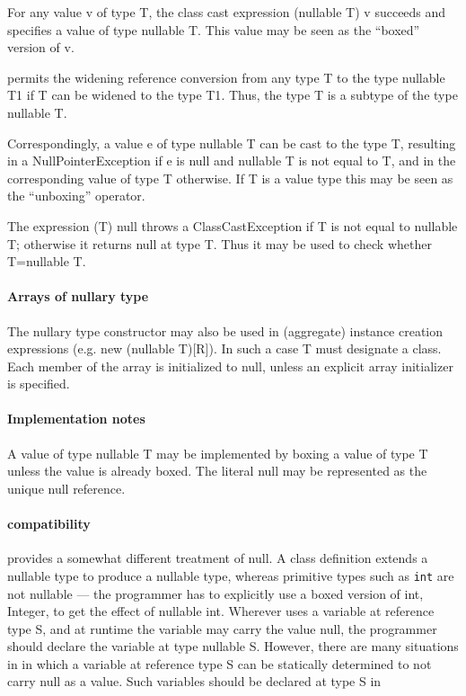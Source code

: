 For any value {\cf v} of type {\cf T}, the class cast expression {\cf
(nullable T) v} succeeds and specifies a value of type {\cf nullable
T}. This value may be seen as the ``boxed'' version of {\cf v}.

\Xten{} permits the widening reference conversion from any type {\cf T}
to the type {\cf nullable T1} if {\cf T} can be widened to the type {\cf
T1}. Thus, the type {\cf T} is a subtype of the type {\cf nullable T}.

Correspondingly, a value {\cf e} of type {\cf nullable T} can be cast to the
type {\cf T}, resulting in a {\cf NullPointerException} if {\cf e} is
{\cf null} and {\cf nullable T} is not equal to {\cf T}, and in the
corresponding value of type {\cf T} otherwise.  If {\cf T} is a value
type this may be seen as the ``unboxing'' operator.

The expression {\cf (T) null} throws a {\cf ClassCastException} if {\cf
T} is not equal to {\cf nullable T}; otherwise it returns {\cf null} at type
{\cf T}. Thus it may be used to check whether {\cf T=nullable T}.

\paragraph{Arrays of nullary type}
The nullary type constructor may also be used in (aggregate) instance
creation expressions (e.g.{} {\cf new (nullable T)[R]}). In such a
case {\cf T} must designate a class. Each member of the array is
initialized to {\cf null}, unless an explicit array initializer is
specified.

\paragraph{Implementation notes}
A value of type {\cf nullable T} may be implemented by boxing a value of
type {\cf T} unless the value is already boxed. The literal {\cf null}
may be represented as the unique null reference.

\paragraph{\Java{} compatibility}

\java{} provides a somewhat different treatment of {\cf null}.  A
class definition extends a nullable type to produce a nullable type,
whereas primitive types such as {\tt int} are not nullable --- the
programmer has to explicitly use a boxed version of {\cf int}, {\cf
Integer}, to get the effect of {\cf nullable int}. Wherever \Java{} uses a
variable at reference type {\cf S}, and at runtime the variable may
carry the value {\cf null}, the \Xten{} programmer should declare the
variable at type {\cf nullable S}. However, there are many situations
in \java{} in which a variable at reference type {\cf S} can be
statically determined to not carry null as a value. Such variables
should be declared at type {\cf S} in \Xten{}

